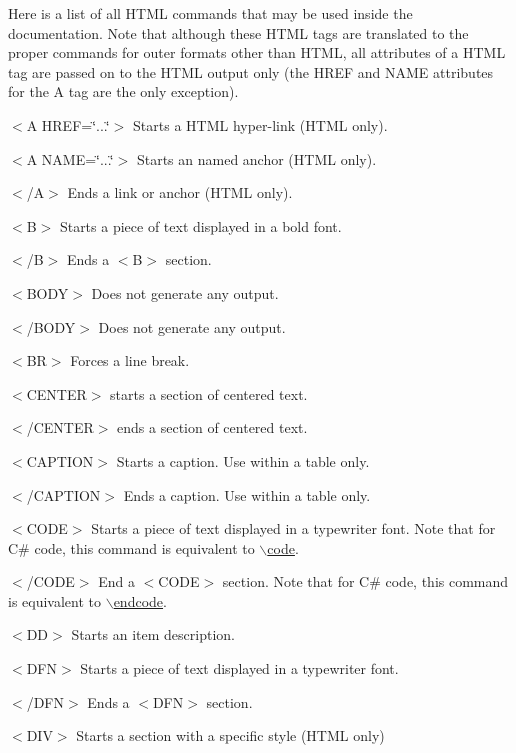 Here is a list of all HTML commands that may be used inside the documentation. Note that although these HTML tags are translated to the proper commands for outer formats other than HTML, all attributes of a HTML tag are passed on to the HTML output only (the HREF and NAME attributes for the A tag are the only exception).


\begin{DoxyItemize}
\item {\ttfamily $<$A HREF=\char`\"{}...\char`\"{}$>$} Starts a HTML hyper-\/link (HTML only). 
\item {\ttfamily $<$A NAME=\char`\"{}...\char`\"{}$>$} Starts an named anchor (HTML only). 
\item {\ttfamily $<$/A$>$} Ends a link or anchor (HTML only). 
\item {\ttfamily $<$B$>$} Starts a piece of text displayed in a bold font. 
\item {\ttfamily $<$/B$>$} Ends a {\ttfamily $<$B$>$} section. 
\item {\ttfamily $<$BODY$>$} Does not generate any output. 
\item {\ttfamily $<$/BODY$>$} Does not generate any output. 
\item {\ttfamily $<$BR$>$} Forces a line break. 
\item {\ttfamily $<$CENTER$>$} starts a section of centered text. 
\item {\ttfamily $<$/CENTER$>$} ends a section of centered text. 
\item {\ttfamily $<$CAPTION$>$} Starts a caption. Use within a table only. 
\item {\ttfamily $<$/CAPTION$>$} Ends a caption. Use within a table only. 
\item {\ttfamily $<$CODE$>$} Starts a piece of text displayed in a typewriter font. Note that for C\# code, this command is equivalent to \hyperlink{commands_cmdcode}{$\backslash$code}. 
\item {\ttfamily $<$/CODE$>$} End a {\ttfamily $<$CODE$>$} section. Note that for C\# code, this command is equivalent to \hyperlink{commands_cmdendcode}{$\backslash$endcode}. 
\item {\ttfamily $<$DD$>$} Starts an item description. 
\item {\ttfamily $<$DFN$>$} Starts a piece of text displayed in a typewriter font. 
\item {\ttfamily $<$/DFN$>$} Ends a {\ttfamily $<$DFN$>$} section. 
\item {\ttfamily $<$DIV$>$} Starts a section with a specific style (HTML only) 

\end{DoxyItemize}
